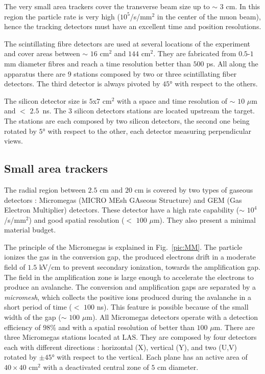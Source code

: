 The very small area trackers cover the transverse beam size up to $\sim$ $3$ cm. In this region the particle rate is very high ($10^5$/s/mm$^2$ in the center of the muon beam), hence the tracking detectors must have an excellent time and position resolutions.

The scintillating fibre detectors are used at several locations of the experiment and cover areas between $\sim$ $16$ cm$^2$ and $144$ cm$^2$. They are fabricated from $0.5$-$1$ mm diameter fibres and reach a time resolution better than $500$ ps. All along the apparatus there are $9$ stations composed by two or three scintillating fiber detectors. The third detector is always pivoted by $45$° with respect to the others.

The silicon detector size is $5$x$7$ cm$^2$ with a space and time resolution of $\sim$ $10$ $\mu$m and $<$ $2.5$~ns. The $3$ silicon detectors stations are located upstream the target. The stations are each composed by two silicon detectors, the second one being rotated by $5$° with respect to the other, each detector measuring perpendicular views.

\subsection{Small area trackers}

The radial region between $2.5$ cm and $20$ cm is covered by two types of gaseous detectors : Micromegas (MICRO MEsh GAseous Structure) and GEM (Gas Electron Multiplier) detectors. These detector have a high rate capability ($\sim$ $10^4$/s/mm$^2$) and good spatial resolution ($<$ $100$ $\mu$m). They also present a minimal material budget.

The principle of the Micromegas is explained in Fig.~\ref{pic:MM}. The particle ionizes the gas in the conversion gap, the produced electrons drift in a moderate field of $1.5$ kV/cm to prevent secondary ionization, towards the amplification gap. The field in the amplification zone is large enough to accelerate the electrons to produce an avalanche. The conversion and amplification gaps are separated by a \textit{micromesh}, which collects the positive ions produced during the avalanche in a short period of time ($<$ $100$ ns). This feature is possible because of the small width of the gap ($\sim$ $100$ $\mu$m). All Micromegas detectors operate with a detection efficiency of $98$\% and with a spatial resolution of better than $100$ $\mu$m. There are three Micromegas stations located at LAS. They are composed by four detectors each with different directions : horizontal (X), vertical (Y), and two (U,V) rotated by $\pm$$45$° with respect to the vertical. Each plane has an active area of $40 \times 40$ cm$^2$ with a deactivated central zone of $5$ cm diameter.

